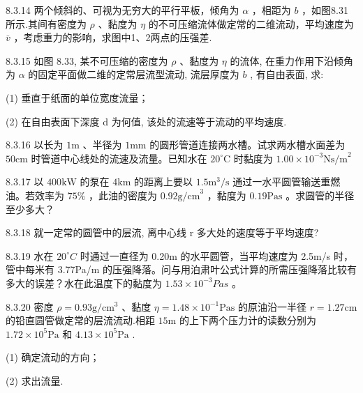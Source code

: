 \begin{problem}{8.3.14}
两个倾斜的、可视为无穷大的平行平板，倾角为 $\alpha$ ，相距为 $b$ ，如图8.31所示.其间有密度为 $\rho$ 、黏度为 $\eta$ 的不可压缩流体做定常的二维流动，平均速度为 $\bar{v}$ ，考虑重力的影响，求图中1、2两点的压强差.
\begin{center}

\end{center}
\end{problem}
\clearpage


\begin{problem}{8.3.15}
如图 8.33, 某不可压缩的密度为 $\rho$ 、黏度为 $\eta$ 的流体, 在重力作用下沿倾角为 $\alpha$ 的固定平面做二维的定常层流型流动, 流层厚度为 $b$ , 有自由表面, 求:

(1) 垂直于纸面的单位宽度流量；

(2) 在自由表面下深度 d 为何值, 该处的流速等于流动的平均速度.
\begin{center}

\end{center}
\end{problem}
\clearpage


\begin{problem}{8.3.16}
以长为 $1\mathrm{m}$ 、半径为 $1\mathrm{mm}$ 的圆形管道连接两水槽。试求两水槽水面差为 $50\mathrm{cm}$ 时管道中心线处的流速及流量。已知水在 $20^{\circ}\mathrm{C}$ 时黏度为 $1.00\times 10^{-3}\mathrm{Ns / m}^2$
\end{problem}
\clearpage


\begin{problem}{8.3.17}
以 $400\mathrm{kW}$ 的泵在 $4\mathrm{km}$ 的距离上要以 $1.5\mathrm{m}^3/\mathrm{s}$ 通过一水平圆管输送重燃油。若效率为 $75\%$ ，此油的密度为 $0.92\mathrm{g/cm}^3$ ，黏度为 $0.19\mathrm{Pas}$ 。求圆管的半径至少多大？
\end{problem}
\clearpage


\begin{problem}{8.3.18}
就一定常的圆管中的层流, 离中心线 r 多大处的速度等于平均速度?
\end{problem}
\clearpage


\begin{problem}{8.3.19}
水在 $20^{\circ}C$ 时通过一直径为 0.20m 的水平圆管，当平均速度为 2.5m/s 时，管中每米有 3.77Pa/m 的压强降落。问与用泊肃叶公式计算的所需压强降落比较有多大的误差？水在此温度下的黏度为 $1.53 \times 10^{-3}Pas$ 。
\end{problem}
\clearpage


\begin{problem}{8.3.20}
密度 $\rho = 0.93\mathrm{g} / \mathrm{cm}^3$ 、黏度 $\eta = 1.48\times 10^{-1}\mathrm{Pas}$ 的原油沿一半径 $r = 1.27\mathrm{cm}$ 的铅直圆管做定常的层流流动.相距 $15\mathrm{m}$ 的上下两个压力计的读数分别为 $1.72\times 10^{5}\mathrm{Pa}$ 和 $4.13\times 10^{5}\mathrm{Pa}$ .

(1) 确定流动的方向；

(2) 求出流量.
\end{problem}
\clearpage


